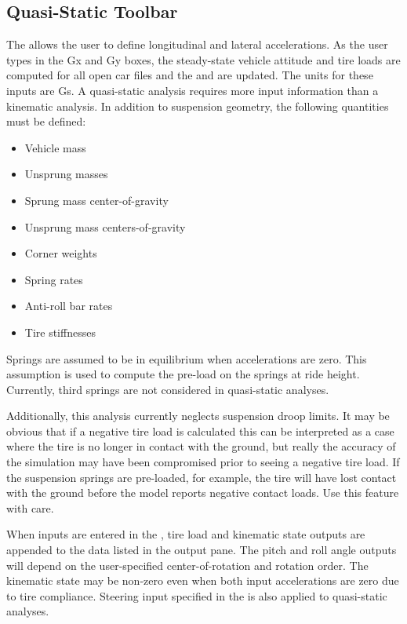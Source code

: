 \subsection{Quasi-Static Toolbar} \label{ssec:quasiStaticToolbar}

The  allows the user to define longitudinal and lateral accelerations.  As the user types in the Gx and Gy boxes, the steady-state vehicle attitude and tire loads are computed for all open car files and the  and  are updated.  The units for these inputs are Gs.  A quasi-static analysis requires more input information than a kinematic analysis.  In addition to suspension geometry, the following quantities must be defined:

\begin{itemize}
\item Vehicle mass
\item Unsprung masses
\item Sprung mass center-of-gravity
\item Unsprung mass centers-of-gravity
\item Corner weights
\item Spring rates
\item Anti-roll bar rates
\item Tire stiffnesses
\end{itemize}

Springs are assumed to be in equilibrium when accelerations are zero.  This assumption is used to compute the pre-load on the springs at ride height.  Currently, third springs are not considered in quasi-static analyses.

Additionally, this analysis currently neglects suspension droop limits.  It may be obvious that if a negative tire load is calculated this can be interpreted as a case where the tire is no longer in contact with the ground, but really the accuracy of the simulation may have been compromised prior to seeing a negative tire load.  If the suspension springs are pre-loaded, for example, the tire will have lost contact with the ground before the model reports negative contact loads.  Use this feature with care.

When inputs are entered in the , tire load and kinematic state outputs are appended to the data listed in the output pane.  The pitch and roll angle outputs will depend on the user-specified center-of-rotation and rotation order.  The kinematic state may be non-zero even when both input accelerations are zero due to tire compliance.  Steering input specified in the  is also applied to quasi-static analyses.


